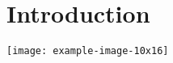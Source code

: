 \documentclass{beamer}
\begin{document}
\section{Introduction}

\begin{frame}
\texttt{[image: example-image-10x16]}
\end{frame}
\end{document}
